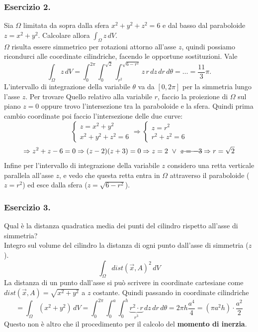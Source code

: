 \documentclass[10pt]{article}
\theoremstyle{plain}
\theoremstyle{definition}
\begin{document}
\subsubsection{Esercizio 2.}
Sia $\Omega$ limitata da sopra dalla sfera $x^2+y^2+z^2 = 6$ e dal basso dal paraboloide $z=x^2+y^2$. Calcolare allora $\int_{\Omega} z\,dV$.\\
$\Omega$ risulta essere simmetrico per rotazioni attorno all'asse $z$, quindi possiamo ricondurci alle coordinate cilindriche, facendo le opportune sostituzioni. Vale
$$\int_{\Omega} z\,dV = \int_0^{2\pi}\int_0^{\sqrt{2}}\int_{r^2}^{\sqrt{6-r^2}} z\,r\,dz\,dr\,d\theta = \ldots = \frac{11}{3} \pi.$$
L'intervallo di integrazione della variabile $\theta$ va da $[0,2\pi]$ per la simmetria lungo l'asse $z$. Per trovare Quello relativo alla variabile $r$, faccio la proiezione di $\Omega$ sul piano $z=0$ oppure trovo l'intersezione tra la paraboloide e la sfera. Quindi prima cambio coordinate poi faccio l'intersezione delle due curve:
$$\begin{cases}
 z=x^2+y^2 \\ x^2+y^2+z^2 =6
\end{cases} \Rightarrow 
\begin{cases}
 z=r^2 \\ r^2+z^2 =6
\end{cases} $$
$$\Rightarrow z^2+z-6=0 \Rightarrow (z-2)(z+3)=0 \Rightarrow z=2 \ \vee \ \text{\sout{$z=-3$}} \Rightarrow r=\sqrt{2}$$
Infine per l'intervallo di integrazione della variabile $z$ considero una retta verticale parallela all'asse $z$, e vedo che questa retta entra in $\Omega$ attraverso il paraboloide ($z=r^2$) ed esce dalla sfera ($z=\sqrt{6-r^2}$).

\subsubsection{Esercizio 3.}
Qual è la distanza quadratica media dei punti del cilindro rispetto all'asse di simmetria?\\
Integro sul volume del cilindro la distanza di ogni punto dall'asse di simmetria ($z$).
$$\int_{\Omega} dist(\vec{x},A)^2 \,dV$$
La distanza di un punto dall'asse si può scrivere in coordinate cartesiane come $dist(\vec{x},A) = \sqrt{x^2+y^2}$ a $z$ costante. Quindi passando in coordinate cilindriche
$$=\int_{\Omega} (x^2+y^2)\,dV = \int_0^{2\pi} \int_0^a\int_0^h \underbrace{r^2 \cdot r}_{r^3} \,dz\,dr\,d\theta = 2\pi h \frac{a^4}{4} = (\pi a^2 h)\cdot\frac{a^2}{2}$$
Questo non è altro che il procedimento per il calcolo del \textbf{momento di inerzia}.
\end{document}
